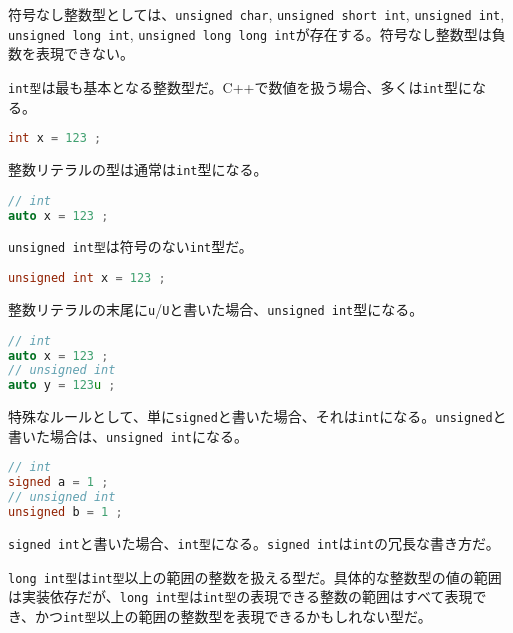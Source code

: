 符号なし整数型としては、\texttt{unsigned char}, \texttt{unsigned short int}, \texttt{unsigned int}, \texttt{unsigned long int}, \texttt{unsigned long long int}が存在する。符号なし整数型は負数を表現できない。


\texttt{int型}は最も基本となる整数型だ。C++で数値を扱う場合、多くは\texttt{int}型になる。

\begin{lstlisting}[language={C++}]
int x = 123 ;
\end{lstlisting}

整数リテラルの型は通常は\texttt{int}型になる。

\begin{lstlisting}[language={C++}]
// int
auto x = 123 ;
\end{lstlisting}

\texttt{unsigned int型}は符号のない\texttt{int}型だ。

\begin{lstlisting}[language={C++}]
unsigned int x = 123 ;
\end{lstlisting}

整数リテラルの末尾に\texttt{u}/\texttt{U}と書いた場合、\texttt{unsigned int}型になる。

\begin{lstlisting}[language={C++}]
// int
auto x = 123 ;
// unsigned int
auto y = 123u ;
\end{lstlisting}

特殊なルールとして、単に\texttt{signed}と書いた場合、それは\texttt{int}になる。\texttt{unsigned}と書いた場合は、\texttt{unsigned int}になる。

\begin{lstlisting}[language={C++}]
// int
signed a = 1 ;
// unsigned int
unsigned b = 1 ;
\end{lstlisting}

\texttt{signed int}と書いた場合、\texttt{int型}になる。\texttt{signed int}は\texttt{int}の冗長な書き方だ。


\texttt{long int型}は\texttt{int型}以上の範囲の整数を扱える型だ。具体的な整数型の値の範囲は実装依存だが、\texttt{long int型}は\texttt{int型}の表現できる整数の範囲はすべて表現でき、かつ\texttt{int型}以上の範囲の整数型を表現できるかもしれない型だ。

